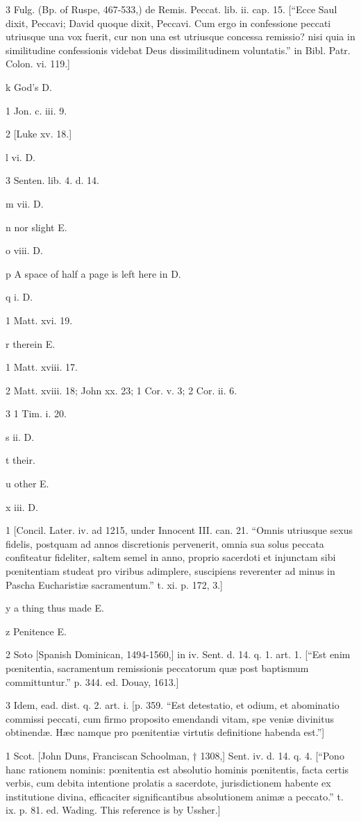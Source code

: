 3
Fulg. (Bp. of Ruspe, 467-533,) de Remis. Peccat. lib. ii. cap. 15. [“Ecce Saul dixit, Peccavi; David quoque dixit, Peccavi. Cum ergo in confessione peccati utriusque una vox fuerit, cur non una est utriusque concessa remissio? nisi quia in similitudine confessionis videbat Deus dissimilitudinem voluntatis.” in Bibl. Patr. Colon. vi. 119.]

k
God’s D.

1
Jon. c. iii. 9.

2
[Luke xv. 18.]

l
vi. D.

3
Senten. lib. 4. d. 14.

m
vii. D.

n
nor slight E.

o
viii. D.

p
A space of half a page is left here in D.

q
i. D.

1
Matt. xvi. 19.

r
therein E.

1
Matt. xviii. 17.

2
Matt. xviii. 18; John xx. 23; 1 Cor. v. 3; 2 Cor. ii. 6.

3
1 Tim. i. 20.

s
ii. D.

t
their.

u
other E.

x
iii. D.

1
[Concil. Later. iv. ad 1215, under Innocent III. can. 21. “Omnis utriusque sexus fidelis, postquam ad annos discretionis pervenerit, omnia sua solus peccata confiteatur fideliter, saltem semel in anno, proprio sacerdoti et injunctam sibi pœnitentiam studeat pro viribus adimplere, suscipiens reverenter ad minus in Pascha Eucharistiæ sacramentum.” t. xi. p. 172, 3.]

y
a thing thus made E.

z
Penitence E.

2
Soto [Spanish Dominican, 1494-1560,] in iv. Sent. d. 14. q. 1. art. 1. [“Est enim pœnitentia, sacramentum remissionis peccatorum quæ post baptismum committuntur.” p. 344. ed. Douay, 1613.]

3
Idem, ead. dist. q. 2. art. i. [p. 359. “Est detestatio, et odium, et abominatio commissi peccati, cum firmo proposito emendandi vitam, spe veniæ divinitus obtinendæ. Hæc namque pro pœnitentiæ virtutis definitione habenda est.”]

1
Scot. [John Duns, Franciscan Schoolman, † 1308,] Sent. iv. d. 14. q. 4. [“Pono hanc rationem nominis: pœnitentia est absolutio hominis pœnitentis, facta certis verbis, cum debita intentione prolatis a sacerdote, jurisdictionem habente ex institutione divina, efficaciter significantibus absolutionem animæ a peccato.” t. ix. p. 81. ed. Wading. This reference is by Ussher.]

